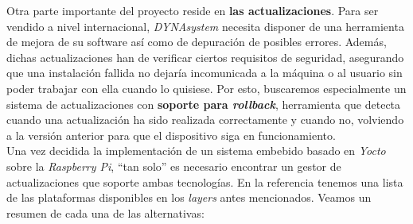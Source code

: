 Otra parte importante del proyecto reside en \textbf{las actualizaciones}. Para ser vendido a nivel internacional, \textit{DYNAsystem} necesita disponer de una herramienta de mejora de su software así como de depuración de posibles errores. Además, dichas actualizaciones han de verificar ciertos requisitos de seguridad, asegurando que una instalación fallida no dejaría incomunicada a la máquina o al usuario sin poder trabajar con ella cuando lo quisiese. Por esto, buscaremos especialmente un sistema de actualizaciones con \textbf{soporte para \textit{rollback}}, herramienta que detecta cuando una actualización ha sido realizada correctamente y cuando no, volviendo a la versión anterior para que el dispositivo siga en funcionamiento.\\

Una vez decidida la implementación de un sistema embebido basado en \textit{Yocto} sobre la \textit{Raspberry Pi}, ``tan solo'' es necesario encontrar un gestor de actualizaciones que soporte ambas tecnologías. En la referencia \cite{yocto-system-update} tenemos una lista de las plataformas disponibles en los \textit{layers} antes mencionados. Veamos un resumen de cada una de las alternativas:

